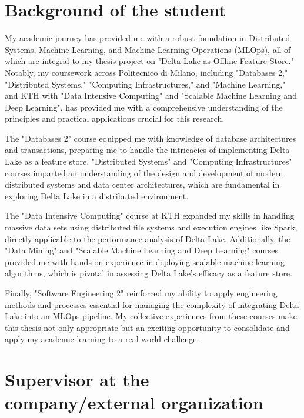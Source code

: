 \documentclass[12pt,twoside,english]{article}
\begin{document}
\section{Background of the student}

My academic journey has provided me with a robust foundation in Distributed Systems, Machine Learning, and Machine Learning Operations (MLOps), all of which are integral to my thesis project on "Delta Lake as Offline Feature Store." Notably, my coursework across Politecnico di Milano, including "Databases 2," "Distributed Systems," "Computing Infrastructures," and "Machine Learning," and KTH with "Data Intensive Computing" and "Scalable Machine Learning and Deep Learning", has provided me with a comprehensive understanding of the principles and practical applications crucial for this research.

The "Databases 2" course equipped me with knowledge of database architectures and transactions, preparing me to handle the intricacies of implementing Delta Lake as a feature store. "Distributed Systems" and "Computing Infrastructures" courses imparted an understanding of the design and development of modern distributed systems and data center architectures, which are fundamental in exploring Delta Lake in a distributed environment.

The "Data Intensive Computing" course at KTH expanded my skills in handling massive data sets using distributed file systems and execution engines like Spark, directly applicable to the performance analysis of Delta Lake. Additionally, the "Data Mining" and "Scalable Machine Learning and Deep Learning" courses provided me with hands-on experience in deploying scalable machine learning algorithms, which is pivotal in assessing Delta Lake's efficacy as a feature store.

Finally, "Software Engineering 2" reinforced my ability to apply engineering methods and processes essential for managing the complexity of integrating Delta Lake into an MLOps pipeline. My collective experiences from these courses make this thesis not only appropriate but an exciting opportunity to consolidate and apply my academic learning to a real-world challenge.


\section{Supervisor at the company/external organization}
\end{document}
